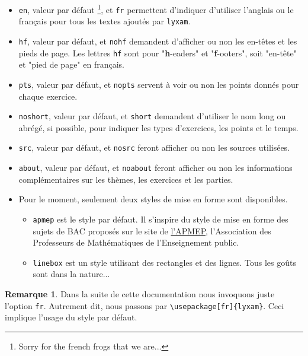 \documentclass[12pt,a4paper]{scrartcl}
\theoremstyle{definition}
\newtheorem*{remark}{Remarque}
\begin{document}
\begin{itemize}
	\item \verb+en+, valeur par défaut
	\footnote{
		Sorry for the french frogs that we are...
	}, et \verb+fr+ permettent d'indiquer d'utiliser l'anglais ou le français pour tous les textes ajoutés par \verb+lyxam+.

	\item \verb+hf+, valeur par défaut, et \verb+nohf+ demandent d'afficher ou non les en-têtes et les pieds de page.
	Les lettres \verb+hf+ sont pour "\textbf{h}-eaders" et "\textbf{f}-ooters", soit "en-tête" et "pied de page" en français.

	\item \verb+pts+, valeur par défaut, et \verb+nopts+ servent à voir ou non les points donnés pour chaque exercice.

	\item \verb+noshort+, valeur par défaut, et \verb+short+ demandent d'utiliser le nom long ou abrégé, si possible, pour indiquer les types d'exercices, les points et le temps.

	\item \verb+src+, valeur par défaut, et \verb+nosrc+ feront afficher ou non les sources utilisées.

	\item \verb+about+, valeur par défaut, et \verb+noabout+ feront afficher ou non les informations complémentaires sur les thèmes, les exercices et les parties.
	\item Pour le moment, seulement deux styles de mise en forme sont disponibles.
	\begin{itemize}[label={\small\textbullet}]
		\item \verb+apmep+ est le style par défaut. Il s'inspire du style de mise en forme des sujets de BAC proposés sur le site de \href{https://www.apmep.fr}{l'APMEP}, l'Association des Professeurs de Mathématiques de l'Enseignement public.

		\item \verb+linebox+ est un style utilisant des rectangles et des lignes. Tous les goûts sont dans la nature...
	\end{itemize}
\end{itemize}


\begin{remark}
	Dans la suite de cette documentation nous invoquons juste l'option \verb+fr+.
	Autrement dit, nous passons par \verb+\usepackage[fr]{lyxam}+. Ceci implique l'usage du style par défaut.
\end{remark}
\end{document}
